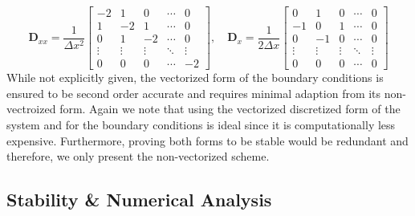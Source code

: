 \begin{equation}
\mathbf{D}_{xx} = \frac{1}{\Delta x^2} 
\begin{bmatrix} 
-2 & 1 & 0 & \cdots & 0 \\ 
1 & -2 & 1 & \cdots & 0 \\ 
0 & 1 & -2 & \cdots & 0 \\ 
\vdots & \vdots & \vdots & \ddots & \vdots \\ 
0 & 0 & 0 & \cdots & -2 
\end{bmatrix}, 
\quad 
\mathbf{D}_x = \frac{1}{2\Delta x} 
\begin{bmatrix} 
0 & 1 & 0 & \cdots & 0 \\ 
-1 & 0 & 1 & \cdots & 0 \\ 
0 & -1 & 0 & \cdots & 0 \\ 
\vdots & \vdots & \vdots & \ddots & \vdots \\ 
0 & 0 & 0 & \cdots & 0 
\end{bmatrix}
\end{equation}
While not explicitly given, the vectorized form of the boundary conditions is ensured to be second order accurate and requires minimal adaption from its non-vectroized form. Again we note that using the vectorized discretized form of the system and for the boundary conditions is ideal since it is computationally less expensive. Furthermore, proving both forms to be stable would be redundant and therefore, we only present the non-vectorized scheme. 






\subsection{Stability \& Numerical Analysis}
